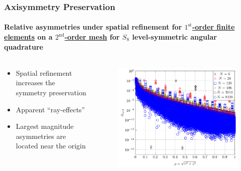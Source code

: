 \documentclass[compress,t]{beamer}
\begin{document}
\begin{frame}[t]
\frametitle{Axisymmetry Preservation}
\framesubtitle{Relative asymmetries under spatial refinement for \underline{$1^\text{st}$-order finite elements} on a \underline{$2^\text{nd}$-order mesh} for $S_8$ level-symmetric angular quadrature}

\begin{columns}[T]

\begin{column}{0.4\textwidth}
\begin{itemize}
\item{Spatial refinement increases the symmetry preservation}
\item{Apparent ``ray-effects'' }
\item{Largest magnitude asymmetries are located near the origin}
\end{itemize}

\end{column}

\begin{column}{0.6\textwidth}
\begin{figure}
\flushright
\includegraphics[scale=0.6]{./graphics/RZASMMSLinearRhoBrunnerp1S8g2.pdf}
\end{figure}

\end{column}

\end{columns}

\end{frame}
\end{document}
